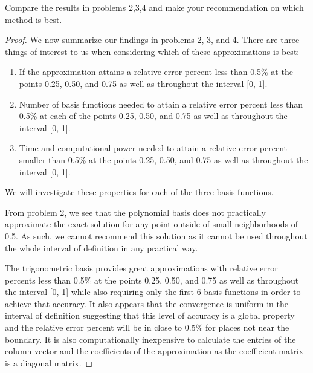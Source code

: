 \begin{problem}
  Compare the results in problems 2,3,4 and make your recommendation on
  which method is best.
\end{problem}

\begin{proof}
  We now summarize our findings in problems 2, 3, and 4. There are three things
  of interest to us when considering which of these approximations is best:
  \begin{enumerate}
    \item If the approximation attains a relative error percent less than 0.5\%
      at the points 0.25, 0.50, and 0.75 as well as throughout the interval [0, 1].
    \item Number of basis functions needed to attain a relative error percent
      less than 0.5\% at each of the points 0.25, 0.50, and 0.75 as well as throughout the interval [0, 1].
    \item Time and computational power needed to attain a relative error
      percent smaller than 0.5\% at the points 0.25, 0.50, and 0.75 as well as throughout the interval [0, 1].
  \end{enumerate}
  We will investigate these properties for each of the three basis functions.

  From problem 2, we see that the polynomial basis does not practically
  approximate the exact solution for any point outside of small neighborhoods of 0.5.
  As such, we cannot recommend this solution
  as it cannot be used throughout the whole interval of definition in any practical way.

  The trigonometric basis provides great approximations with relative error percents less than 0.5\%
  at the points 0.25, 0.50, and 0.75 as well as throughout the interval [0, 1]
  while also requiring only the first 6 basis functions in order to achieve that accuracy.
  It also appears that the convergence is uniform in the interval of definition suggesting
  that this level of accuracy is a global property and the relative error percent will be in close to 0.5\% for places not near the boundary.
  It is also computationally inexpensive to calculate the entries of the column vector and the coefficients of the
  approximation as the coefficient matrix is a diagonal matrix.


\end{proof}
